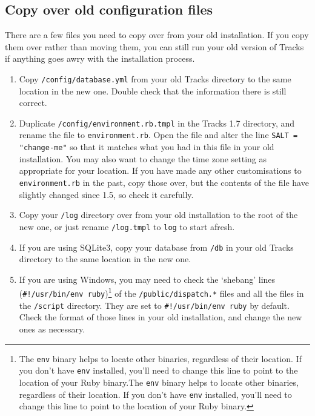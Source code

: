 \documentclass[10pt,twoside]{memoir}
\begin{document}
\subsection{Copy over old configuration files}
\label{config_upgrade}

There are a few files you need to copy over from your old installation. If you copy them over rather than moving them, you can still run your old version of Tracks if anything goes awry with the installation process.


\begin{enumerate}


\item Copy \texttt{/config/database.yml} from your old Tracks directory to the same location in the new one. Double check that the information there is still correct.

\item Duplicate \texttt{/config/environment.rb.tmpl} in the Tracks 1.7 directory, and rename the file to \texttt{environment.rb}. Open the file and alter the line \texttt{SALT = "change-me"} so that it matches what you had in this file in your old installation. You may also want to change the time zone setting as appropriate for your location. If you have made any other customisations to \texttt{environment.rb} in the past, copy those over, but the contents of the file have slightly changed since 1.5, so check it carefully.

\item Copy your \texttt{/log} directory over from your old installation to the root of the new one, or just rename \texttt{/log.tmpl} to \texttt{log} to start afresh.

\item If you are using SQLite3, copy your database from \texttt{/db} in your old Tracks directory to the same location in the new one.

\item If you are using Windows, you may need to check the `shebang' lines (\texttt{\#!/usr/bin/env ruby})\footnote{The \texttt{env} binary helps to locate other binaries, regardless of their location. If you don't have \texttt{env} installed, you'll need to change this line to point to the location of your Ruby binary.The \texttt{env} binary helps to locate other binaries, regardless of their location. If you don't have \texttt{env} installed, you'll need to change this line to point to the location of your Ruby binary.} of the \texttt{/public/dispatch.*} files and all the files in the \texttt{/script} directory. They are set to \texttt{\#!/usr/bin/env ruby} by default. Check the format of those lines in your old installation, and change the new ones as necessary.
\end{enumerate}
\end{document}
